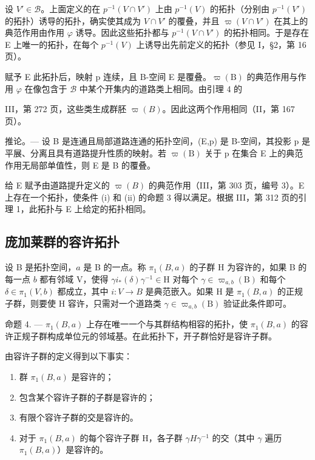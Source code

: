 设 \(V' \in \mathcal{B}\)。上面定义的在 \(p^{-1}(V \cap V')\) 上由 \(p^{-1}(V)\) 的拓扑（分别由 \(p^{-1}(V')\) 的拓扑）诱导的拓扑，确实使其成为 \(V \cap V'\) 的覆叠，并且 \(\varpi(V \cap V')\) 在其上的典范作用由作用 \(\varphi\) 诱导。因此这些拓扑都与 \(p^{-1}(V \cap V')\) 的拓扑相同。于是存在 E 上唯一的拓扑，在每个 \(p^{-1}(V)\) 上诱导出先前定义的拓扑（参见 I，§2，第 16 页）。

赋予 E 此拓扑后，映射 p 连续，且 B-空间 E 是覆叠。\(\varpi(\mathrm{B})\) 的典范作用与作用 \(\varphi\) 在像包含于 \(\mathcal{B}\) 中某个开集内的道路类上相同。由引理 4 的

III，第 272 页，这些类生成群胚 \(\varpi(B)\)。因此这两个作用相同（II，第 167 页）。

推论。--- 设 B 是连通且局部道路连通的拓扑空间，(E,p) 是 B-空间，其投影 p 是平展、分离且具有道路提升性质的映射。若 \(\varpi(\mathrm{B})\) 关于 p 在集合 E 上的典范作用无局部单值性，则 E 是 B 的覆叠。

给 E 赋予由道路提升定义的 \(\varpi(B)\) 的典范作用（III，第 303 页，编号 3）。E 上存在一个拓扑，使条件 (i) 和 (ii) 的命题 3 得以满足。根据 III，第 312 页的引理 1，此拓扑与 E 上给定的拓扑相同。

\subsection{庞加莱群的容许拓扑}

设 B 是拓扑空间，\(a\) 是 B 的一点。称 \(\pi_1(B, a)\) 的子群 H 为容许的，如果 B 的每一点 \(b\) 都有邻域 V，使得 \(\gamma i_*(\delta)\gamma^{-1} \in \mathrm{H}\) 对每个 \(\gamma \in \varpi_{a,b}(\mathrm{B})\) 和每个 \(\delta \in \pi_1(V, b)\) 都成立，其中 \(i: V \to B\) 是典范嵌入。如果 H 是 \(\pi_1(B, a)\) 的正规子群，则要使 H 容许，只需对一个道路类 \(\gamma \in \varpi_{a,b}(\mathrm{B})\) 验证此条件即可。

命题 4. — \(\pi_1(B, a)\) 上存在唯一一个与其群结构相容的拓扑，使 \(\pi_1(B, a)\) 的容许正规子群构成单位元的邻域基。在此拓扑下，开子群恰好是容许子群。

由容许子群的定义得到以下事实：

\begin{enumerate}
\def\labelenumi{\alph{enumi})}
\item
  群 \(\pi_1(B, a)\) 是容许的；
\item
  包含某个容许子群的子群是容许的；
\item
  有限个容许子群的交是容许的。
\item
对于 \(\pi_{1}(B,a)\) 的每个容许子群 H，各子群 \(\gamma H\gamma^{-1}\) 的交（其中 \(\gamma\) 遍历 \(\pi_{1}(B,a)\)）是容许的。
\end{enumerate}

